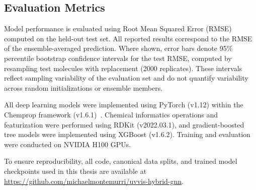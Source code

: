 \subsection{Evaluation Metrics}

Model performance is evaluated using Root Mean Squared Error (RMSE) computed on the held-out test set. All reported results correspond to the RMSE of the ensemble-averaged prediction. Where shown, error bars denote 95\% percentile bootstrap confidence intervals for the test RMSE, computed by resampling test molecules with replacement (2000 replicates). These intervals reflect sampling variability of the evaluation set and do not quantify variability across random initializations or ensemble members.


All deep learning models were implemented using PyTorch (v1.12) within the Chemprop framework (v1.6.1)~\cite{yang2019analyzing}. Chemical informatics operations and featurization were performed using RDKit (v2022.03.1), and gradient-boosted tree models were implemented using XGBoost (v1.6.2). Training and evaluation were conducted on NVIDIA H100 GPUs.

To ensure reproducibility, all code, canonical data splits, and trained model checkpoints used in this thesis are available at \url{https://github.com/michaelmontemurri/uvvis-hybrid-gnn}.

